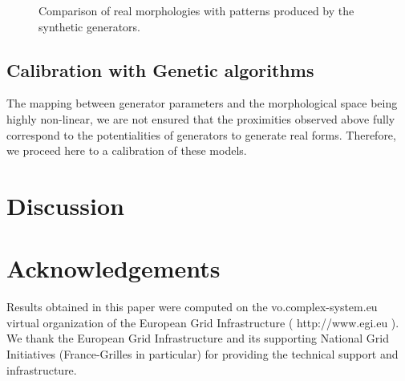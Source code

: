 \documentclass[letterpaper]{article}
\begin{document}
\begin{figure}
    \centering
    \caption{Comparison of real morphologies with patterns produced by the synthetic generators.}
    \label{fig:lhs}
\end{figure}


\subsection{Calibration with Genetic algorithms}

The mapping between generator parameters and the morphological space being highly non-linear, we are not ensured that the proximities observed above fully correspond to the potentialities of generators to generate real forms. Therefore, we proceed here to a calibration of these models.



\section{Discussion}







\section{Acknowledgements}

Results obtained in this paper were computed on the vo.complex-system.eu virtual organization of the European Grid Infrastructure ( http://www.egi.eu ). We thank the European Grid Infrastructure and its supporting National Grid Initiatives (France-Grilles in particular) for providing the technical support and infrastructure.

\footnotesize

\end{document}

